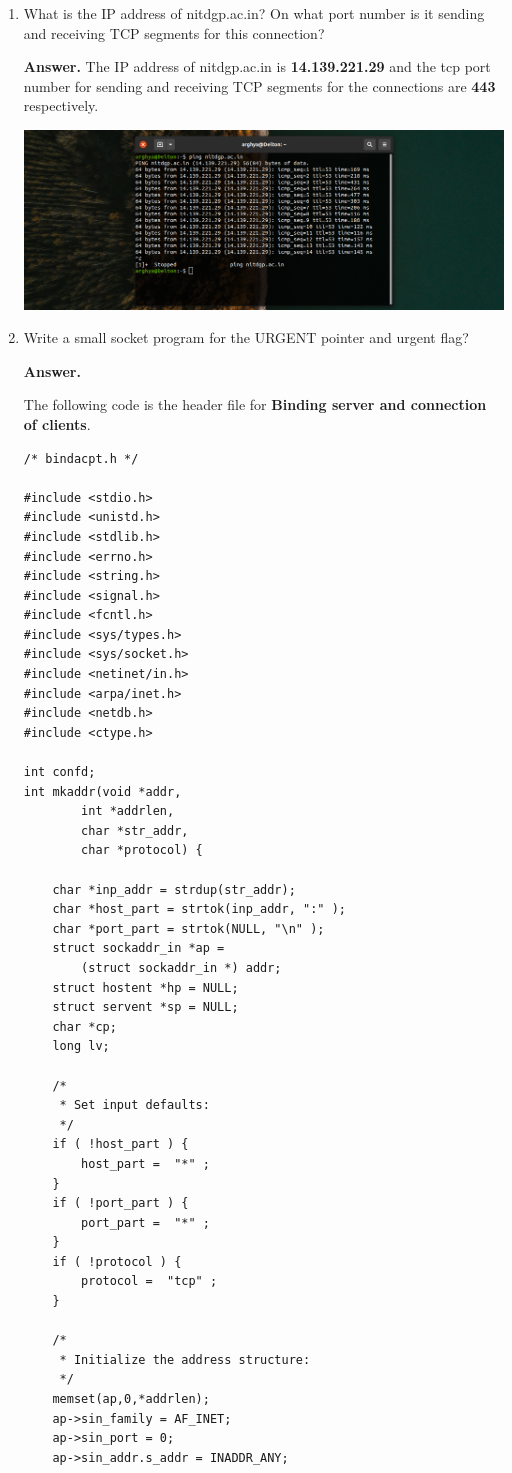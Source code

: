 \documentclass{article}
\begin{document}
\begin{enumerate}
\begin{enumerate}
\item What is the IP address of nitdgp.ac.in? On what port number is it sending and receiving
TCP segments for this connection?

\textbf{Answer.} The IP address of nitdgp.ac.in is \textbf{14.139.221.29} and the tcp port number for sending and receiving TCP segments for the connections are \textbf{443} respectively.

\includegraphics[width=700pt]{Question3B}

\item Write a small socket program for the URGENT pointer and urgent flag?

\textbf{Answer.}

The following code is the header file for \textbf{Binding server and connection of clients}.

\begin{lstlisting}
/* bindacpt.h */ 

#include <stdio.h>
#include <unistd.h>
#include <stdlib.h>
#include <errno.h>
#include <string.h>
#include <signal.h>
#include <fcntl.h>
#include <sys/types.h>
#include <sys/socket.h>
#include <netinet/in.h>
#include <arpa/inet.h>
#include <netdb.h>
#include <ctype.h>

int confd;
int mkaddr(void *addr,  
		int *addrlen,  
		char *str_addr,  
		char *protocol) {  

	char *inp_addr = strdup(str_addr);  
	char *host_part = strtok(inp_addr, ":" );  
	char *port_part = strtok(NULL, "\n" );  
	struct sockaddr_in *ap =  
		(struct sockaddr_in *) addr;  
	struct hostent *hp = NULL;  
	struct servent *sp = NULL;  
	char *cp;  
	long lv;  

	/* 
	 * Set input defaults: 
	 */  
	if ( !host_part ) {  
		host_part =  "*" ;  
	}  
	if ( !port_part ) {  
		port_part =  "*" ;  
	}  
	if ( !protocol ) {  
		protocol =  "tcp" ;  
	}  

	/* 
	 * Initialize the address structure: 
	 */  
	memset(ap,0,*addrlen);  
	ap->sin_family = AF_INET;  
	ap->sin_port = 0;  
	ap->sin_addr.s_addr = INADDR_ANY;  


\end{lstlisting}
\end{enumerate}
\end{enumerate}
\end{document}
